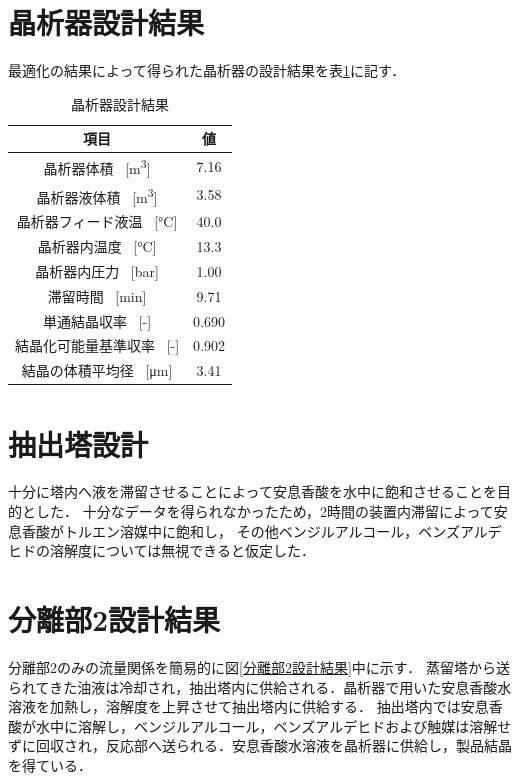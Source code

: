 \documentclass[a4j]{jsreport}
\begin{document}
\section{晶析器設計結果}
最適化の結果によって得られた晶析器の設計結果を表\ref{晶析器設計結果}に記す．
\begin{table}[htbp]
  \centering
  \caption{晶析器設計結果}
  \label{晶析器設計結果}
  \begin{tabular}{cc}
    \hline
    項目 & 値 \\
    \hline
    晶析器体積 \, [\si{\cubic \metre}] &7.16 \\
    晶析器液体積 \, [\si{\cubic \metre}] &3.58 \\
    晶析器フィード液温 \, [\si{\degreeCelsius}] & 40.0 \\
    晶析器内温度 \, [\si{\degreeCelsius}] &13.3 \\
    晶析器内圧力 \, [\si{bar}] &1.00 \\
    滞留時間 \, [\si{min}] &9.71 \\
    単通結晶収率 \, [\si{-}] &0.690 \\
    結晶化可能量基準収率 \, [\si{-}] &0.902 \\
    結晶の体積平均径 \, [\si{\micro \metre}] &3.41 \\
    \hline
  \end{tabular}
\end{table}

\section{抽出塔設計}
十分に塔内へ液を滞留させることによって安息香酸を水中に飽和させることを目的とした．
十分なデータを得られなかったため，2時間の装置内滞留によって安息香酸がトルエン溶媒中に飽和し，
その他ベンジルアルコール，ベンズアルデヒドの溶解度については無視できると仮定した．

\section{分離部2設計結果}
分離部2のみの流量関係を簡易的に図\ref{分離部2設計結果}中に示す．
蒸留塔から送られてきた油液は冷却され，抽出塔内に供給される．晶析器で用いた安息香酸水溶液を加熱し，溶解度を上昇させて抽出塔内に供給する．
抽出塔内では安息香酸が水中に溶解し，ベンジルアルコール，ベンズアルデヒドおよび触媒は溶解せずに回収され，反応部へ送られる．安息香酸水溶液を晶析器に供給し，製品結晶を得ている．
\end{document}
